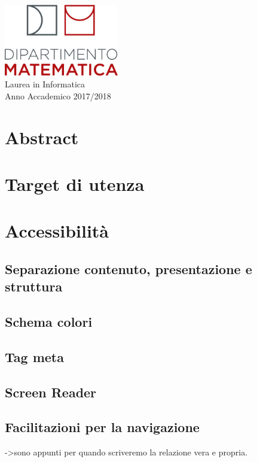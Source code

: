 \documentclass[10pt, a4paper]{article}
\newcommand{\normsize}{\fontsize{15pt}{10pt}\selectfont}
\begin{document}
\begin{titlepage}
\vspace*{8px}

\includegraphics[width=50mm]{Images/dip_mat.png}\\
\vspace*{\fill} %
\vspace*{3px}
{\normsize Laurea in Informatica\\ }
\vspace*{0.25px}
{\small Anno Accademico 2017/2018\\ }


\end{titlepage}
\tableofcontents

\section{Abstract}

\section{Target di utenza}

\section{Accessibilità}
	\subsection{Separazione contenuto, presentazione e struttura}
	\subsection{Schema colori}
	\subsection{Tag meta}
	\subsection{Screen Reader}
	\subsection{Facilitazioni per la navigazione}
		->sono appunti per quando scriveremo la relazione vera e propria.
	
\end{document}
